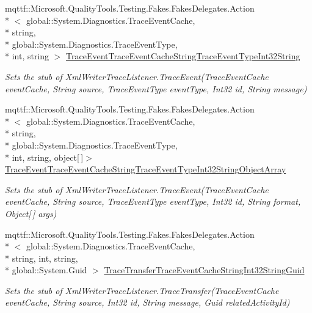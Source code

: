 \begin{DoxyCompactItemize}
mqttf\-::\-Microsoft.\-Quality\-Tools.\-Testing.\-Fakes.\-Fakes\-Delegates.\-Action\\*
$<$ global\-::\-System.\-Diagnostics.\-Trace\-Event\-Cache, \\*
string, \\*
global\-::\-System.\-Diagnostics.\-Trace\-Event\-Type, \\*
int, string $>$ \hyperlink{class_system_1_1_diagnostics_1_1_fakes_1_1_stub_xml_writer_trace_listener_a4cbdd48120aca9cf6400bb9d9cd93ec9}{Trace\-Event\-Trace\-Event\-Cache\-String\-Trace\-Event\-Type\-Int32\-String}
\begin{DoxyCompactList}\small\item\em Sets the stub of Xml\-Writer\-Trace\-Listener.\-Trace\-Event(\-Trace\-Event\-Cache event\-Cache, String source, Trace\-Event\-Type event\-Type, Int32 id, String message)\end{DoxyCompactList}\item 
mqttf\-::\-Microsoft.\-Quality\-Tools.\-Testing.\-Fakes.\-Fakes\-Delegates.\-Action\\*
$<$ global\-::\-System.\-Diagnostics.\-Trace\-Event\-Cache, \\*
string, \\*
global\-::\-System.\-Diagnostics.\-Trace\-Event\-Type, \\*
int, string, object\mbox{[}$\,$\mbox{]}$>$ \hyperlink{class_system_1_1_diagnostics_1_1_fakes_1_1_stub_xml_writer_trace_listener_a3cb58df65b5d7e17aa68bce55be08ada}{Trace\-Event\-Trace\-Event\-Cache\-String\-Trace\-Event\-Type\-Int32\-String\-Object\-Array}
\begin{DoxyCompactList}\small\item\em Sets the stub of Xml\-Writer\-Trace\-Listener.\-Trace\-Event(\-Trace\-Event\-Cache event\-Cache, String source, Trace\-Event\-Type event\-Type, Int32 id, String format, Object\mbox{[}$\,$\mbox{]} args)\end{DoxyCompactList}\item 
mqttf\-::\-Microsoft.\-Quality\-Tools.\-Testing.\-Fakes.\-Fakes\-Delegates.\-Action\\*
$<$ global\-::\-System.\-Diagnostics.\-Trace\-Event\-Cache, \\*
string, int, string, \\*
global\-::\-System.\-Guid $>$ \hyperlink{class_system_1_1_diagnostics_1_1_fakes_1_1_stub_xml_writer_trace_listener_a39ca26e34c53a5785e5322016288e5ba}{Trace\-Transfer\-Trace\-Event\-Cache\-String\-Int32\-String\-Guid}
\begin{DoxyCompactList}\small\item\em Sets the stub of Xml\-Writer\-Trace\-Listener.\-Trace\-Transfer(\-Trace\-Event\-Cache event\-Cache, String source, Int32 id, String message, Guid related\-Activity\-Id)\end{DoxyCompactList}\item 

\end{DoxyCompactItemize}
